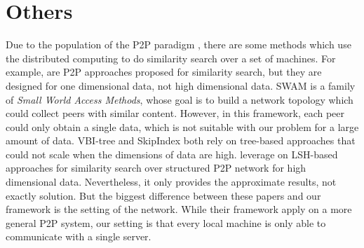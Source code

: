 \section{Others} %
\label{s:others}
Due to the population of the P2P paradigm \cite{SCAN, Chord}, there are some methods which use the distributed computing to do similarity search over a set of machines.  For example, \cite{PRING,Mercury,77} are P2P approaches proposed for similarity search, but they are designed for one dimensional data, not high dimensional data.  SWAM \cite{SWAM} is a family of \emph{Small World Access Methods}, whose goal is to build a network topology which could collect peers with similar content.  However, in this framework, each peer could only obtain a single data, which is not suitable with our problem for a large amount of data.  VBI-tree and SkipIndex both rely on tree-based approaches that could not scale when the dimensions of data are high. \cite{LSH} leverage on LSH-based approaches for similarity search over structured P2P network for high dimensional data.  Nevertheless, it only provides the approximate results, not exactly solution.  But the biggest difference between these papers and our framework is the setting of the network.  While their framework apply on a more general P2P system, our setting is that every local machine is only able to communicate with a single server.

%
%